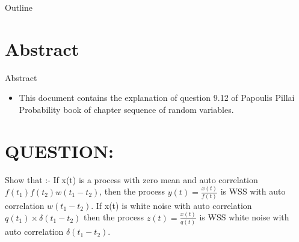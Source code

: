 \documentclass{beamer}
\title{\typedef{ASSIGNMENT-7}}
\author{MUSKAN JAISWAL -cs21btech11037}
\date{May 2022}
\begin{document}
\begin{frame}{Outline}
  \tableofcontents
\end{frame}
\section{Abstract}
	\begin{frame}{Abstract}
		\begin{itemize}
			\item 	This document contains the explanation of question  9.12  of Papoulis Pillai Probability book of chapter sequence of random variables.
		\end{itemize}
	\end{frame}
	
\maketitle

\section{QUESTION:}
\begin{frame}{}
\begin{block}{}

Show that :- If x(t) is a process with zero mean and auto correlation $f(t_1)f(t_2) w(t_1-t_2) $, then the process $y(t)=\frac{x(t)}{f(t)}$ is WSS with auto correlation $w(t_1-t_2) $. If x(t) is white noise with auto correlation $q(t_1) \times \delta(t_1-t_2)$
then the process $z(t) = \frac{x(t)}{q(t)}$ is WSS white noise with auto correlation 
$\delta(t_1-t_2) $.

\end{block}
\end{frame}
\end{document}
